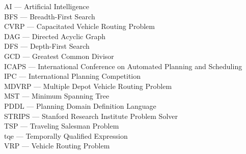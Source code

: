 
AI --- Artificial Intelligence\\
BFS --- Breadth-First Search\\
CVRP --- Capacitated Vehicle Routing Problem\\
DAG --- Directed Acyclic Graph\\
DFS --- Depth-First Search\\
GCD --- Greatest Common Divisor\\
ICAPS --- International Conference on Automated Planning and Scheduling\\
IPC --- International Planning Competition\\
MDVRP --- Multiple Depot Vehicle Routing Problem\\
MST --- Minimum Spanning Tree\\
PDDL --- Planning Domain Definition Language\\
STRIPS --- Stanford Research Institute Problem Solver\\
TSP --- Traveling Salesman Problem\\
tqe --- Temporally Qualified Expression\\
VRP --- Vehicle Routing Problem\\